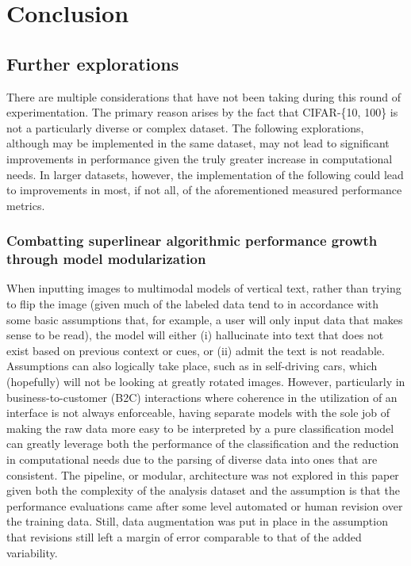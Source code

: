 \documentclass[conference]{IEEEtran}
\begin{document}
\section{Conclusion}

\subsection{Further explorations}
There are multiple considerations that have not been taking during this round of experimentation. The primary reason arises by the fact that CIFAR-\{10, 100\} is not a particularly diverse or complex dataset. The following explorations, although may be implemented in the same dataset, may not lead to significant improvements in performance given the truly greater increase in computational needs. In larger datasets, however, the implementation of the following could lead to improvements in most, if not all, of the aforementioned measured performance metrics.

\subsubsection{Combatting superlinear algorithmic performance growth through model modularization}

When inputting images to multimodal models of vertical text, rather than trying to flip the image (given much of the labeled data tend to in accordance with some basic assumptions that, for example, a user will only input data that makes sense to be read), the model will either (i) hallucinate into text that does not exist based on previous context or cues, or (ii) admit the text is not readable. Assumptions can also logically take place, such as in self-driving cars, which (hopefully) will not be looking at greatly rotated images. However, particularly in business-to-customer (B2C) interactions where coherence in the utilization of an interface is not always enforceable, having separate models with the sole job of making the raw data more easy to be interpreted by a pure classification model can greatly leverage both the performance of the classification and the reduction in computational needs due to the parsing of diverse data into ones that are consistent. The pipeline, or modular, architecture was not explored in this paper given both the complexity of the analysis dataset and the assumption is that the performance evaluations came after some level automated or human revision over the training data. Still, data augmentation was put in place in the assumption that revisions still left a margin of error comparable to that of the added variability.
\end{document}
